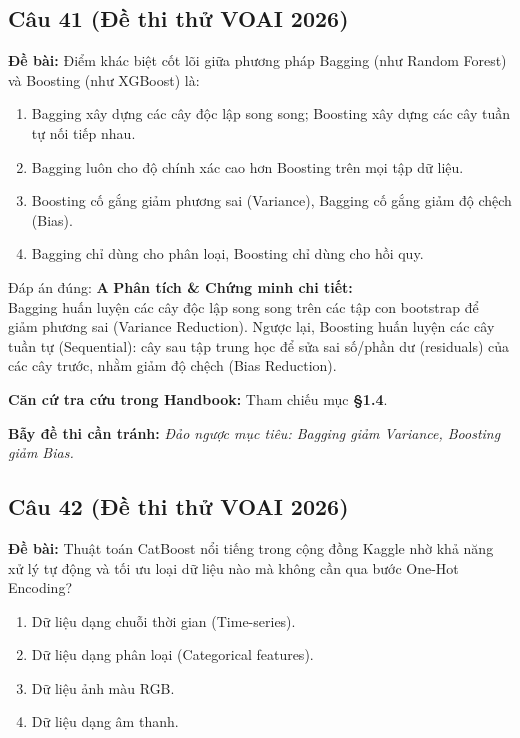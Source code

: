 \documentclass[10pt,a4paper]{article}
\begin{document}
\subsection*{Câu 41 (Đề thi thử VOAI 2026)}
\textbf{Đề bài:} Điểm khác biệt cốt lõi giữa phương pháp Bagging (như Random Forest) và Boosting (như XGBoost) là:

\begin{enumerate}[label=\textbf{\Alph*.}]
    \item Bagging xây dựng các cây độc lập song song; Boosting xây dựng các cây tuần tự nối tiếp nhau.
    \item Bagging luôn cho độ chính xác cao hơn Boosting trên mọi tập dữ liệu.
    \item Boosting cố gắng giảm phương sai (Variance), Bagging cố gắng giảm độ chệch (Bias).
    \item Bagging chỉ dùng cho phân loại, Boosting chỉ dùng cho hồi quy.
\end{enumerate}

\begin{solbox}{Đáp án đúng: \textbf{A}}
\textbf{Phân tích \& Chứng minh chi tiết:} \\
Bagging huấn luyện các cây độc lập song song trên các tập con bootstrap để giảm phương sai (Variance Reduction). Ngược lại, Boosting huấn luyện các cây tuần tự (Sequential): cây sau tập trung học để sửa sai số/phần dư (residuals) của các cây trước, nhằm giảm độ chệch (Bias Reduction).

\vspace{0.4em}
\textbf{Căn cứ tra cứu trong Handbook:} Tham chiếu mục \textbf{§1.4}.

\vspace{0.4em}
\textbf{Bẫy đề thi cần tránh:} \textit{Đảo ngược mục tiêu: Bagging giảm Variance, Boosting giảm Bias.}
\end{solbox}
\vspace{0.5em}


\subsection*{Câu 42 (Đề thi thử VOAI 2026)}
\textbf{Đề bài:} Thuật toán CatBoost nổi tiếng trong cộng đồng Kaggle nhờ khả năng xử lý tự động và tối ưu loại dữ liệu nào mà không cần qua bước One-Hot Encoding?

\begin{enumerate}[label=\textbf{\Alph*.}]
    \item Dữ liệu dạng chuỗi thời gian (Time-series).
    \item Dữ liệu dạng phân loại (Categorical features).
    \item Dữ liệu ảnh màu RGB.
    \item Dữ liệu dạng âm thanh.
\end{enumerate}
\end{document}

